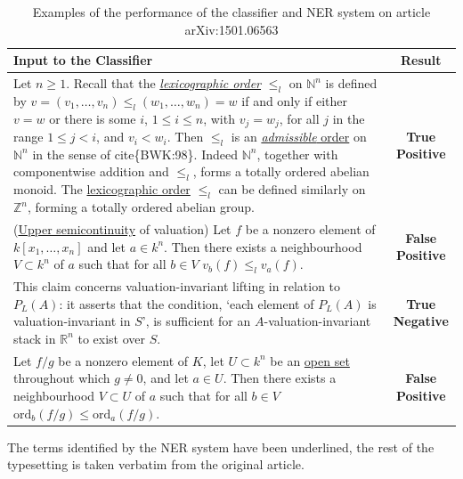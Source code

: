 \documentclass[a4paper]{easychair}
\begin{document}
\begin{table}[h]
    \begin{center}
    \begin{tabular}{|p{}|c|}
        \hline
        \hline
        \textbf{Input to the Classifier} & \textbf{Result} \\
        \hline
        \hline
        Let $n \ge 1$. Recall that the \underline{\emph{lexicographic order}} $\le_l$ on $%
\mathbb{N}^n$ is defined by $v = (v_1, \ldots, v_n) \le_l (w_1, \ldots, w_n)
= w$ if and only if either $v = w$ or there is some $i$, $1 \le i \le n$,
with $v_j = w_j$, for all $j$ in the range $1 \le j < i$, and $v_i < w_i$.
        Then $\le_l$ is an \underline{\emph{admissible} order} on $\mathbb{N}^n$ in the sense of 
cite\{BWK:98\}. Indeed $\mathbb{N}^n$, together with componentwise addition
        and $\le_l$, forms a totally ordered abelian monoid. The \underline{lexicographic order}
$\le_l$ can be defined similarly on $\mathbb{Z}^n$, forming a totally
ordered abelian group.\newline
& \textbf{True Positive}\\
        \hline
        (\underline{Upper semicontinuity} of valuation) Let $f$ be a nonzero element of $k[x_1,
\ldots, x_n]$ and let $a \in k^n$. Then there exists a neighbourhood $V
\subset k^n$ of $a$ such that for all $b \in V$ $v_b(f) \le_l v_a(f)$.
& \textbf{False Positive} \\
        \hline
This claim concerns valuation-invariant lifting in relation to $P_L(A)$:
it asserts that the condition, `each element of $P_L(A)$ is valuation-invariant
in $S$', is sufficient for an $A$-valuation-invariant stack
in $\mathbb{R}^n$ to exist over $S$.
 & \textbf{True Negative}\\
        \hline
        Let $f/g$ be a nonzero element of $K$, let $U \subset k^n$ be an \underline{open set}
throughout which $g \neq 0$, and let $a \in U$. Then there exists a
neighbourhood $V \subset U$ of $a$ such that for all $b \in V$ $\mathrm{ord}%
_b(f/g) \le \mathrm{ord}_a(f/g)$.
& \textbf{False Positive}\\
        \hline
    \end{tabular}
    \caption{\label{examples}Examples of the  performance of the classifier and NER system on article  arXiv:1501.06563} The terms identified by the NER system have been underlined, the rest of the typesetting is taken verbatim from the original article.
    \end{center} 
\end{table}
 
\end{document}
